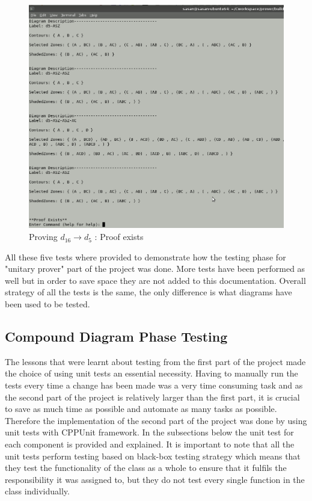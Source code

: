 \documentclass[10pt, a4paper, titlepage]{article}
\begin{document}
\begin{figure}[h]
\centering
\includegraphics[scale=0.4]{images/ss8.png}
\caption{Proving $  d_{16} \rightarrow d_{5} $ : Proof exists}
\label{fig:test6}
\end{figure}

All these five tests where provided to demonstrate how the testing phase for "unitary prover" part of the project was done. More tests have been performed as well but in order to save space they are not added to this documentation. Overall strategy of all the tests is the same, the only difference is what diagrams have been used to be tested. 

\subsection{Compound Diagram Phase Testing}
The lessons that were learnt about testing from the first part of the project made the choice of using unit tests an essential necessity. Having to manually run the tests every time a change has been made was a very time consuming task and as the second part of the project is relatively larger than the first part, it is crucial to save as much time as possible and automate as many tasks as possible. Therefore the implementation of the second part of the project was done by using unit tests with CPPUnit framework. In the subsections below the unit test for each component is provided and explained. It is important to note that all the unit tests perform testing based on black-box testing strategy which means that they test the functionality of the class as a whole to ensure that it fulfils the responsibility it was assigned to, but they do not test every single function in the class individually.     
\end{document}
